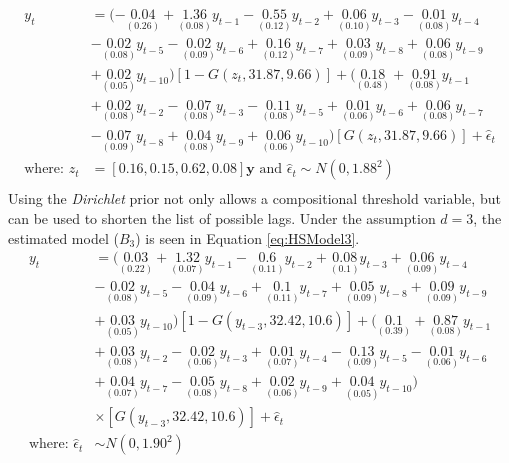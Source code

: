 \begin{equation}
\begin{split}
 	y_t &=(-\underset{(0.26)}{0.04}+\underset{(0.08)}{1.36}y_{t-1}-\underset{(0.12)}{0.55}y_{t-2}+\underset{(0.10)}{0.06}y_{t-3}-\underset{(0.08)}{0.01}y_{t-4}\\
 	&-\underset{(0.08)}{0.02}y_{t-5}-\underset{(0.09)}{0.02}y_{t-6}+\underset{(0.12)}{0.16}y_{t-7}+\underset{(0.09)}{0.03}y_{t-8}+\underset{(0.08)}{0.06}y_{t-9}\\
 	&+\underset{(0.05)}{0.02}y_{t-10})[1-G(z_t,31.87,9.66)]+(\underset{(0.48)}{0.18}+\underset{(0.08)}{0.91}y_{t-1}\\
 	&+\underset{(0.08)}{0.02}y_{t-2}-\underset{(0.08)}{0.07}y_{t-3}-\underset{(0.08)}{0.11}y_{t-5}+\underset{(0.06)}{0.01}y_{t-6}+\underset{(0.08)}{0.06}y_{t-7}\\
 	&-\underset{(0.09)}{0.07}y_{t-8}+\underset{(0.08)}{0.04}y_{t-9}+\underset{(0.06)}{0.06}y_{t-10})[G(z_t,31.87,9.66)]+\hat{\epsilon}_t\\
 	\textrm{where: }  z_t&=[0.16,0.15,0.62,0.08]\bm{y} \textrm{ and } \hat{\epsilon}_t \sim N(0, 1.88^2)\\
\end{split}
\label{eq:HSModelDIR}
\end{equation}
Using the \textit{Dirichlet} prior not only allows a compositional threshold variable, but can be used to shorten the list of possible lags. Under the assumption $d=3$, the estimated model ($B_3$) is seen in Equation \ref{eq:HSModel3}.
\begin{equation}
\begin{split}
 	y_t &=(\underset{(0.22)}{0.03}+\underset{(0.07)}{1.32}y_{t-1}-\underset{(0.11)}{0.6}y_{t-2}+\underset{(0.1)}{0.08}y_{t-3}+\underset{(0.09)}{0.06}y_{t-4}\\
 	&-\underset{(0.08)}{0.02}y_{t-5}-\underset{(0.09)}{0.04}y_{t-6}+\underset{(0.11)}{0.1}y_{t-7}+\underset{(0.09)}{0.05}y_{t-8}+\underset{(0.09)}{0.09}y_{t-9}\\
 	&+\underset{(0.05)}{0.03}y_{t-10})[1-G(y_{t-3},32.42,10.6)]+(\underset{(0.39)}{0.1}+\underset{(0.08)}{0.87}y_{t-1}\\
 	&+\underset{(0.08)}{0.03}y_{t-2}-\underset{(0.06)}{0.02}y_{t-3}+\underset{(0.07)}{0.01}y_{t-4}-\underset{(0.09)}{0.13}y_{t-5}-\underset{(0.06)}{0.01}y_{t-6}\\
 	&+\underset{(0.07)}{0.04}y_{t-7}-\underset{(0.08)}{0.05}y_{t-8}+\underset{(0.06)}{0.02}y_{t-9}+\underset{(0.05)}{0.04}y_{t-10})\\
 	&\times[G(y_{t-3},32.42,10.6)]+\hat{\epsilon}_t\\
 	\textrm{where: } \hat{\epsilon}_t &\sim N(0, 1.90^2)\\
\end{split}
\label{eq:HSModel3}
\end{equation}
